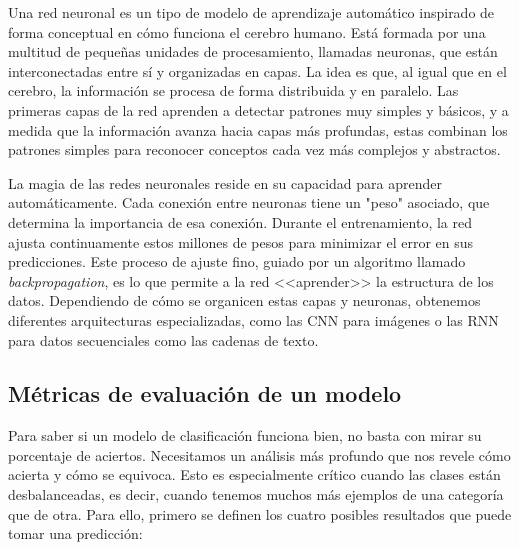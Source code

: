 
Una red neuronal es un tipo de modelo de aprendizaje automático inspirado de forma conceptual en cómo funciona el cerebro humano. Está formada por una multitud de pequeñas unidades de procesamiento, llamadas neuronas, que están interconectadas entre sí y organizadas en capas. La idea es que, al igual que en el cerebro, la información se procesa de forma distribuida y en paralelo. Las primeras capas de la red aprenden a detectar patrones muy simples y básicos, y a medida que la información avanza hacia capas más profundas, estas combinan los patrones simples para reconocer conceptos cada vez más complejos y abstractos.

La magia de las redes neuronales reside en su capacidad para aprender automáticamente. Cada conexión entre neuronas tiene un "peso" asociado, que determina la importancia de esa conexión. Durante el entrenamiento, la red ajusta continuamente estos millones de pesos para minimizar el error en sus predicciones. Este proceso de ajuste fino, guiado por un algoritmo llamado \textit{backpropagation}, es lo que permite a la red <<aprender>> la estructura de los datos. Dependiendo de cómo se organicen estas capas y neuronas, obtenemos diferentes arquitecturas especializadas, como las CNN para imágenes o las RNN para datos secuenciales como las cadenas de texto.

\subsection{Métricas de evaluación de un modelo}

Para saber si un modelo de clasificación funciona bien, no basta con mirar su porcentaje de aciertos. Necesitamos un análisis más profundo que nos revele cómo acierta y cómo se equivoca. Esto es especialmente crítico cuando las clases están desbalanceadas, es decir, cuando tenemos muchos más ejemplos de una categoría que de otra. Para ello, primero se definen los cuatro posibles resultados que puede tomar una predicción:

